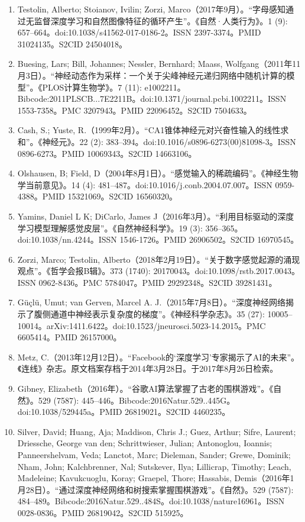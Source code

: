 \begin{enumerate}
\item Testolin, Alberto; Stoianov, Ivilin; Zorzi, Marco（2017年9月）。“字母感知通过无监督深度学习和自然图像特征的循环产生”。《自然·人类行为》。1 (9): 657–664。doi:10.1038/s41562-017-0186-2。ISSN 2397-3374。PMID 31024135。S2CID 24504018。
\item Buesing, Lars; Bill, Johannes; Nessler, Bernhard; Maass, Wolfgang（2011年11月3日）。“神经动态作为采样：一个关于尖峰神经元递归网络中随机计算的模型”。《PLOS计算生物学》。7 (11): e1002211。Bibcode:2011PLSCB...7E2211B。doi:10.1371/journal.pcbi.1002211。ISSN 1553-7358。PMC 3207943。PMID 22096452。S2CID 7504633。
\item Cash, S.; Yuste, R.（1999年2月）。“CA1锥体神经元对兴奋性输入的线性求和”。《神经元》。22 (2): 383–394。doi:10.1016/s0896-6273(00)81098-3。ISSN 0896-6273。PMID 10069343。S2CID 14663106。
\item Olshausen, B; Field, D（2004年8月1日）。“感觉输入的稀疏编码”。《神经生物学当前意见》。14 (4): 481–487。doi:10.1016/j.conb.2004.07.007。ISSN 0959-4388。PMID 15321069。S2CID 16560320。
\item Yamins, Daniel L K; DiCarlo, James J（2016年3月）。“利用目标驱动的深度学习模型理解感觉皮层”。《自然神经科学》。19 (3): 356–365。doi:10.1038/nn.4244。ISSN 1546-1726。PMID 26906502。S2CID 16970545。
\item Zorzi, Marco; Testolin, Alberto（2018年2月19日）。“关于数字感觉起源的涌现观点”。《哲学会报B辑》。373 (1740): 20170043。doi:10.1098/rstb.2017.0043。ISSN 0962-8436。PMC 5784047。PMID 29292348。S2CID 39281431。
\item Güçlü, Umut; van Gerven, Marcel A. J.（2015年7月8日）。“深度神经网络揭示了腹侧通道中神经表示复杂度的梯度”。《神经科学杂志》。35 (27): 10005–10014。arXiv:1411.6422。doi:10.1523/jneurosci.5023-14.2015。PMC 6605414。PMID 26157000。
\item Metz, C.（2013年12月12日）。“Facebook的‘深度学习’专家揭示了AI的未来”。《连线》杂志。原文档案存档于2014年3月28日。于2017年8月26日检索。
\item Gibney, Elizabeth（2016年）。“谷歌AI算法掌握了古老的围棋游戏”。《自然》。529 (7587): 445–446。Bibcode:2016Natur.529..445G。doi:10.1038/529445a。PMID 26819021。S2CID 4460235。
\item Silver, David; Huang, Aja; Maddison, Chris J.; Guez, Arthur; Sifre, Laurent; Driessche, George van den; Schrittwieser, Julian; Antonoglou, Ioannis; Panneershelvam, Veda; Lanctot, Marc; Dieleman, Sander; Grewe, Dominik; Nham, John; Kalchbrenner, Nal; Sutskever, Ilya; Lillicrap, Timothy; Leach, Madeleine; Kavukcuoglu, Koray; Graepel, Thore; Hassabis, Demis（2016年1月28日）。“通过深度神经网络和树搜索掌握围棋游戏”。《自然》。529 (7587): 484–489。Bibcode:2016Natur.529..484S。doi:10.1038/nature16961。ISSN 0028-0836。PMID 26819042。S2CID 515925。

\end{enumerate}

